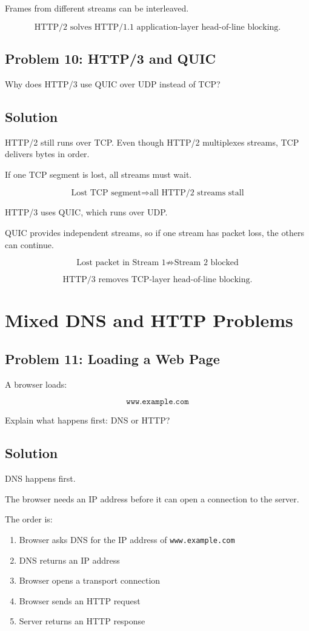 \documentclass[12pt]{article}
\begin{document}
Frames from different streams can be interleaved.

\[
\boxed{\text{HTTP/2 solves HTTP/1.1 application-layer head-of-line blocking.}}
\]

\subsection*{Problem 10: HTTP/3 and QUIC}
Why does HTTP/3 use QUIC over UDP instead of TCP?

\subsection*{Solution}
HTTP/2 still runs over TCP. Even though HTTP/2 multiplexes streams, TCP delivers bytes in order.

If one TCP segment is lost, all streams must wait.

\[
\text{Lost TCP segment} \Rightarrow \text{all HTTP/2 streams stall}
\]

HTTP/3 uses QUIC, which runs over UDP.

QUIC provides independent streams, so if one stream has packet loss, the others can continue.

\[
\text{Lost packet in Stream 1} \not\Rightarrow \text{Stream 2 blocked}
\]

\[
\boxed{\text{HTTP/3 removes TCP-layer head-of-line blocking.}}
\]

\section*{Mixed DNS and HTTP Problems}

\subsection*{Problem 11: Loading a Web Page}
A browser loads:

\[
\texttt{www.example.com}
\]

Explain what happens first: DNS or HTTP?

\subsection*{Solution}
DNS happens first.

The browser needs an IP address before it can open a connection to the server.

The order is:

\begin{enumerate}
    \item Browser asks DNS for the IP address of \texttt{www.example.com}
    \item DNS returns an IP address
    \item Browser opens a transport connection
    \item Browser sends an HTTP request
    \item Server returns an HTTP response
\end{enumerate}
\end{document}
